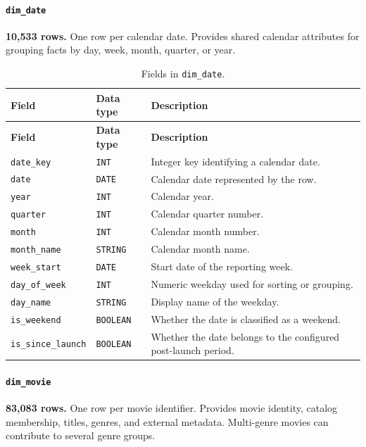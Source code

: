\documentclass[a4paper,12pt]{article}
\newcommand{\dbsep}{\_\allowbreak}
\begin{document}
\paragraph{\texttt{dim\dbsep date}}
\textbf{10,533 rows.} One row per calendar date.
Provides shared calendar attributes for grouping facts by day, week, month, quarter, or year.

\begingroup
\small
\setlength{\tabcolsep}{4pt}
\renewcommand{\arraystretch}{1.1}
\begin{longtable}{@{}>{\raggedright\arraybackslash}p{}
                    >{\raggedright\arraybackslash}p{}
                    >{\raggedright\arraybackslash}p{}@{}}
\caption{Fields in \texttt{dim\dbsep date}.}\\
\toprule
\textbf{Field} & \textbf{Data type} & \textbf{Description}\\
\midrule
\endfirsthead
\toprule
\textbf{Field} & \textbf{Data type} & \textbf{Description}\\
\midrule
\endhead
\bottomrule
\endfoot
\texttt{date\dbsep key} & \texttt{INT} & Integer key identifying a calendar date.\\
\texttt{date} & \texttt{DATE} & Calendar date represented by the row.\\
\texttt{year} & \texttt{INT} & Calendar year.\\
\texttt{quarter} & \texttt{INT} & Calendar quarter number.\\
\texttt{month} & \texttt{INT} & Calendar month number.\\
\texttt{month\dbsep name} & \texttt{STRING} & Calendar month name.\\
\texttt{week\dbsep start} & \texttt{DATE} & Start date of the reporting week.\\
\texttt{day\dbsep of\dbsep week} & \texttt{INT} & Numeric weekday used for sorting or grouping.\\
\texttt{day\dbsep name} & \texttt{STRING} & Display name of the weekday.\\
\texttt{is\dbsep weekend} & \texttt{BOOLEAN} & Whether the date is classified as a weekend.\\
\texttt{is\dbsep since\dbsep launch} & \texttt{BOOLEAN} & Whether the date belongs to the configured post-launch period.\\
\end{longtable}
\endgroup

\paragraph{\texttt{dim\dbsep movie}}
\textbf{83,083 rows.} One row per movie identifier.
Provides movie identity, catalog membership, titles, genres, and external metadata. Multi-genre movies can contribute to several genre groups.
\end{document}
